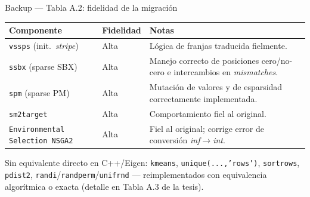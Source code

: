 \documentclass[aspectratio=169,10pt]{beamer}
\begin{document}
{\begin{frame}{Backup --- Tabla A.2: fidelidad de la migración}
  \centering\scriptsize
  \begin{tabular}{p{3.6cm}p{1.6cm}p{6.2cm}}
    \toprule
    \textbf{Componente} & \textbf{Fidelidad} & \textbf{Notas} \\
    \midrule
    \texttt{vssps} (init.\ \textit{stripe}) & Alta & Lógica de franjas traducida fielmente. \\
    \texttt{ssbx} (sparse SBX) & Alta & Manejo correcto de posiciones cero/no-cero e intercambios en \textit{mismatches}. \\
    \texttt{spm} (sparse PM) & Alta & Mutación de valores y de esparsidad correctamente implementada. \\
    \texttt{sm2target} & Alta & Comportamiento fiel al original. \\
    \texttt{Environmental Selection NSGA2} & Alta & Fiel al original; corrige error de conversión \textit{inf}$\to$\textit{int}. \\
    \bottomrule
  \end{tabular}
  \vspace{4pt}
  \footnotesize Sin equivalente directo en C++/Eigen: \texttt{kmeans}, \texttt{unique(...,'rows')}, \texttt{sortrows}, \texttt{pdist2}, \texttt{randi}/\texttt{randperm}/\texttt{unifrnd} --- reimplementados con equivalencia algorítmica o exacta (detalle en Tabla A.3 de la tesis).
\end{frame}

}
\end{document}
